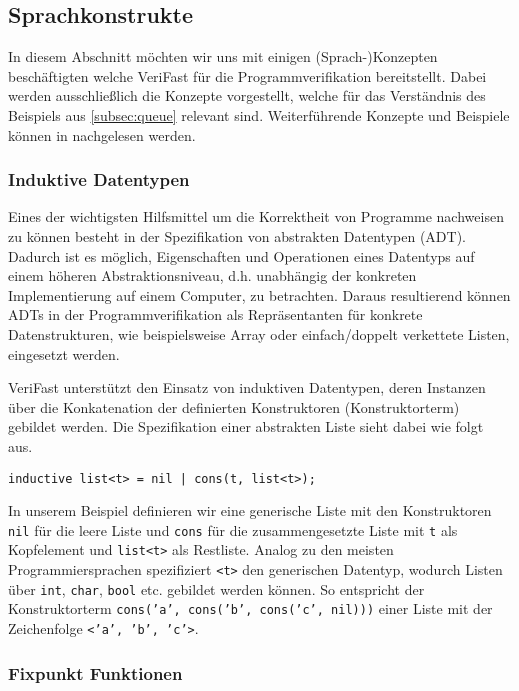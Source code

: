 \subsection{Sprachkonstrukte}

In diesem Abschnitt möchten wir uns mit einigen (Sprach-)Konzepten beschäftigten welche VeriFast für die Programmverifikation bereitstellt. Dabei werden ausschließlich die Konzepte vorgestellt, welche für das Verständnis des Beispiels aus \cref{subsec:queue} relevant sind. Weiterführende Konzepte und Beispiele können in \cite{Jacobs2017} nachgelesen werden.

\subsubsection{Induktive Datentypen}
\label{subsec:adt}

Eines der wichtigsten Hilfsmittel um die Korrektheit von Programme nachweisen zu können besteht in der Spezifikation von abstrakten Datentypen (ADT). Dadurch ist es möglich, Eigenschaften und Operationen eines Datentyps auf einem höheren Abstraktionsniveau, d.h. unabhängig der konkreten Implementierung auf einem Computer, zu betrachten. Daraus resultierend können ADTs in der Programmverifikation als Repräsentanten für konkrete Datenstrukturen, wie beispielsweise Array oder einfach/doppelt verkettete Listen, eingesetzt werden. \cite[S. 265]{Saake2014}

VeriFast unterstützt den Einsatz von induktiven Datentypen, deren Instanzen über die Konkatenation der definierten Konstruktoren (Konstruktorterm) gebildet werden. Die Spezifikation einer abstrakten Liste sieht dabei wie folgt aus.

\begin{lstlisting}
inductive list<t> = nil | cons(t, list<t>);
\end{lstlisting}

\noindent
In unserem Beispiel definieren wir eine generische Liste mit den Konstruktoren \texttt{nil} für die leere Liste und \texttt{cons} für die zusammengesetzte Liste mit \texttt{t} als Kopfelement und \texttt{list<t>} als Restliste. Analog zu den meisten Programmiersprachen spezifiziert \texttt{<t>} den generischen Datentyp, wodurch Listen über \texttt{int}, \texttt{char}, \texttt{bool} etc. gebildet werden können. So entspricht der Konstruktorterm \texttt{cons('a', cons('b', cons('c', nil)))} einer Liste mit der Zeichenfolge \texttt{<'a', 'b', 'c'>}.

\subsubsection{Fixpunkt Funktionen}

